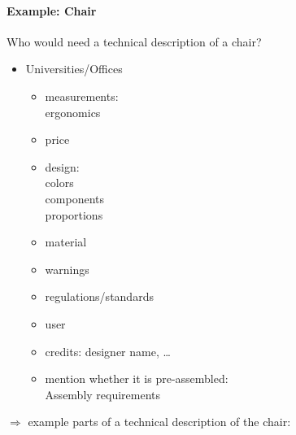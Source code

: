 \paragraph{Example: Chair}
Who would need a technical description of a chair?
\begin{itemize}
\item Universities/Offices
\begin{itemize}
\item measurements:\\
ergonomics
\item price
\item design:\\
colors\\
components\\
proportions
\item material
\item warnings
\item regulations/standards
\item user
\item credits: designer name, …
\item mention whether it is pre-assembled:\\
Assembly requirements
\end{itemize}
\end{itemize}
$\Rightarrow$ example parts of a technical description of the chair:
